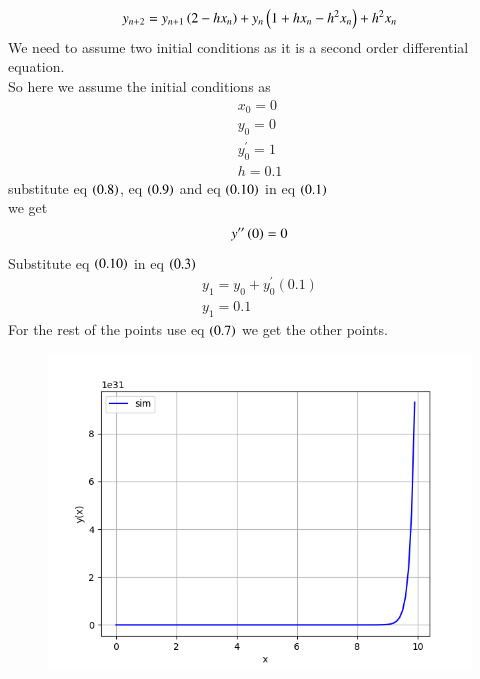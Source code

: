 \documentclass[journal]{IEEEtran}
\begin{document}
\begin{align}
    y_{n+2}=y_{n+1}\left(2-hx_n\right) +y_n\left(1+hx_n-h^2x_n\right)+h^2x_n
\end{align}
We need to assume two initial conditions as it is a second order differential equation. \\So here we assume the initial conditions as 
\begin{align}
    x_0=0\\y_0=0\\y^\prime_0=1\\h=0.1
\end{align}
substitute eq $\left(0.8\right)$, eq $\left(0.9\right)$ and eq $\left(0.10\right)$ in eq $\left(0.1\right)$\\ we get 
\begin{align}
    y^{\prime\prime}\left(0\right)=0
\end{align}
Substitute eq $\left(0.10\right)$ in eq $\left(0.3\right)$
\begin{align}
    y_1=y_0+y^\prime_0(0.1)\\
    y_1=0.1
\end{align}
For the rest of the points use eq $\left(0.7\right)$ we get the other points.
\begin{figure}[h!]
   \centering
   \includegraphics[width=\columnwidth]{figs/fig.png}
\end{figure}
\end{document}
